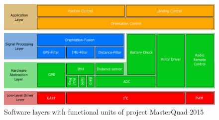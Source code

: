 \begin{figure}[H]
    \centering
    \includegraphics[width=\textwidth]{fig/Software_structure}
    \caption{Software layers with functional units of project MasterQuad 2015}
    \label{fig:layer:layer_graph}
\end{figure}

